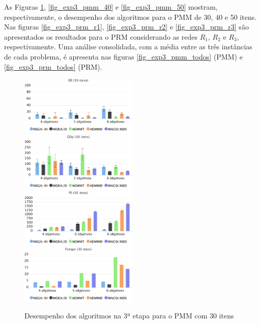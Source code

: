 As Figuras \ref{fig_exp3_pmm_30}, \ref{fig_exp3_pmm_40} e \ref{fig_exp3_pmm_50} mostram, respectivamente, o desempenho dos algoritmos para o PMM de 30, 40 e 50 itens. Nas figuras \ref{fig_exp3_prm_r1}, \ref{fig_exp3_prm_r2} e \ref{fig_exp3_prm_r3} são apresentados os resultados para o PRM considerando as redes $R_1$, $R_2$ e $R_3$, respectivamente. Uma análise consolidada, com a média entre as três instâncias de cada problema, é apresenta nas figuras \ref{fig_exp3_pmm_todos} (PMM) e \ref{fig_exp3_prm_todos} (PRM).

\begin{figure}[!htbp]	
	\includegraphics[width=0.5\textwidth]{cap_experimentos/figs/etapa3/er-mkp-30}
	\includegraphics[width=0.5\textwidth]{cap_experimentos/figs/etapa3/gd-mkp-30}
	\includegraphics[width=0.5\textwidth]{cap_experimentos/figs/etapa3/ps-mkp-30}
	\includegraphics[width=0.5\textwidth]{cap_experimentos/figs/etapa3/time-mkp-30}
	\caption{\label{fig_exp3_pmm_30}Desempenho dos algoritmos na 3ª etapa para o PMM com 30 itens}
\end{figure}

